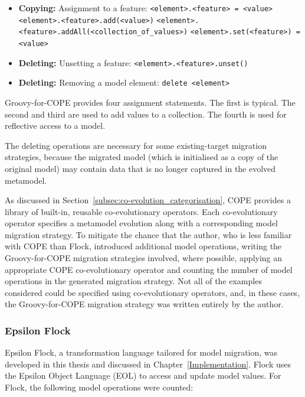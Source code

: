 \begin{itemize}
	\item \textbf{Copying:} Assignment to a feature:
	\subitem \texttt{<element>.<feature> = <value>}
	\subitem \texttt{<element>.<feature>.add(<value>)}
	\subitem \texttt{<element>.<feature>.addAll(<collection\_of\_values>)}
	\subitem \texttt{<element>.set(<feature>) = <value>}
	
	\item \textbf{Deleting:} Unsetting a feature:
	\subitem \texttt{<element>.<feature>.unset()}	
	
	\item \textbf{Deleting:} Removing a model element:
	\subitem \texttt{delete <element>}
\end{itemize}

Groovy-for-COPE provides four assignment statements. The first is typical. The second and third are used to add values to a collection. The fourth is used for reflective access to a model.

The deleting operations are necessary for some existing-target migration strategies, because the migrated model (which is initialised as a copy of the original model) may contain data that is no longer captured in the evolved metamodel.

As discussed in Section~\ref{subsec:co-evolution_categorisation}, COPE provides a library of built-in, reusable co-evolutionary operators. Each co-evolutionary operator specifies a metamodel evolution along with a corresponding model migration strategy. To mitigate the chance that the author, who is less familiar with COPE than Flock, introduced additional model operations, writing the Groovy-for-COPE migration strategies involved, where possible, applying an appropriate COPE co-evolutionary operator and counting the number of model operations in the generated migration strategy. Not all of the examples considered could be specified using co-evolutionary operators, and, in these cases, the Groovy-for-COPE migration strategy was written entirely by the author.


\subsubsection{Epsilon Flock}
Epsilon Flock, a transformation language tailored for model migration, was developed in this thesis and discussed in Chapter~\ref{Implementation}. Flock uses the Epsilon Object Language (EOL) \cite{kolovos06eol} to access and update model values. For Flock, the following model operations were counted:

